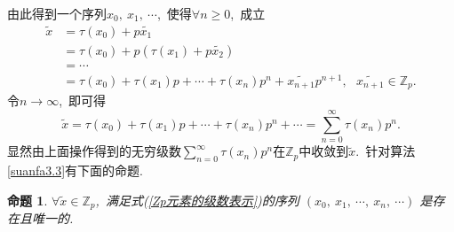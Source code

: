 \documentclass[UTF8, twoside]{ctexart}
\theoremstyle{nonumberplain}
\theoremstyle{nonumberplain}
\theoremstyle{plain}
\newtheorem{mingti}[dingyi]{命题}
\begin{document}
	由此得到一个序列${{x}_{0}},\ {{x}_{1}},\ \cdots $,\ 使得$\forall n\ge 0$,\ 成立
	\begin{align*}
		\widetilde{x}&=\tau \left( {{x}_{0}} \right)+p\widetilde{{{x}_{1}}} \\ 
		& =\tau \left( {{x}_{0}} \right)+p\left( \tau \left( {{x}_{1}} \right)+p\widetilde{{{x}_{2}}} \right) \\ 
		& =\cdots \\
		& =\tau \left( {{x}_{0}} \right)+\tau \left( {{x}_{1}} \right)p+\cdots +\tau \left( {{x}_{n}} \right){{p}^{n}}+\widetilde{{{x}_{n+1}}}{{p}^{n+1}},\text{ }\widetilde{{{x}_{n+1}}}\in {{\mathbb{Z}}_{p}}.
	\end{align*}
	令$n\to \infty $,\ 即可得
	\begin{equation} \label{Zp元素的级数表示}
		\widetilde{x}=\tau \left( {{x}_{0}} \right)+\tau \left( {{x}_{1}} \right)p+\cdots +\tau \left( {{x}_{n}} \right){{p}^{n}}+\cdots=\sum\limits_{n=0}^{\infty }{\tau \left( {{x}_{n}} \right){{p}^{n}}}.
	\end{equation}
	显然由上面操作得到的无穷级数$\sum_{n=0}^{\infty }{\tau \left( {{x}_{n}} \right){{p}^{n}}}$在${{\mathbb{Z}}_{p}}$中收敛到$\widetilde{x}$.\ 针对算法\ref{suanfa3.3}有下面的命题.\ 
	\begin{mingti} \label{202102161623_1}
		$\forall \widetilde{x}\in {{\mathbb{Z}}_{p}}$,\ 满足式(\ref{Zp元素的级数表示})的序列
		$\left( {{x}_{0}},\ {{x}_{1}},\ \cdots ,\ {{x}_{n}},\ \cdots  \right)$
		是存在且唯一的.\ 
	\end{mingti}
\end{document}
